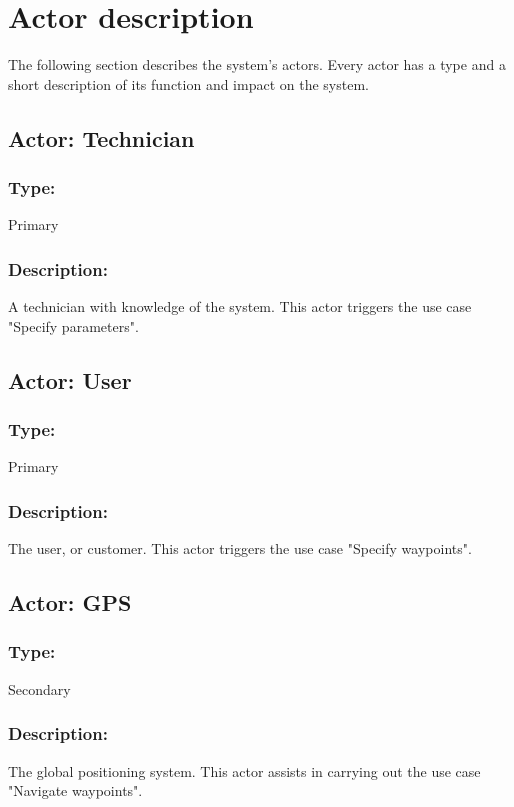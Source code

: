 \section{Actor description}
The following section describes the system's actors. Every actor has a type and a short description of its function and impact on the system.

\begin{framed}
	\subsection{Actor: Technician}
	\subsubsection*{Type:}
	Primary
	
	\subsubsection*{Description:}
	A technician with knowledge of the system. This actor triggers the use case "Specify parameters".
	
\end{framed}

\begin{framed}
	\subsection{Actor: User}
		\subsubsection*{Type:}
			Primary
	
		\subsubsection*{Description:}
			The user, or customer. This actor triggers the use case "Specify waypoints".
\end{framed}

\begin{framed}
	\subsection{Actor: GPS}
		\subsubsection*{Type:}
			Secondary
	
		\subsubsection*{Description:}
			The global positioning system. This actor assists in carrying out the use case "Navigate waypoints".
	
\end{framed}

